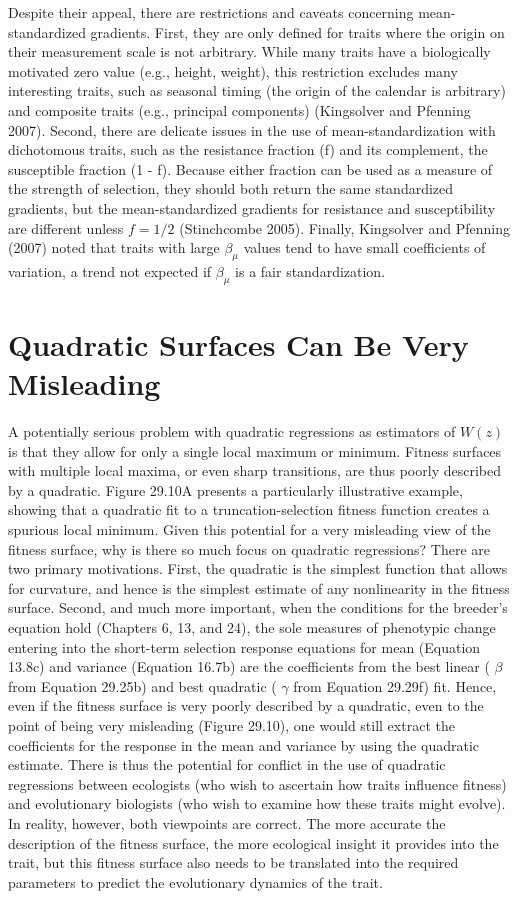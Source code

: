 \documentclass{article}
\begin{document}
Despite their appeal, there are restrictions and caveats concerning mean-standardized gradients. First, they are only defined for traits where the origin on their measurement scale is not arbitrary. While many traits have a biologically motivated zero value (e.g., height, weight), this restriction excludes many interesting traits, such as seasonal timing (the origin of the calendar is arbitrary) and composite traits (e.g., principal components) (Kingsolver and Pfenning 2007). Second, there are delicate issues in the use of mean-standardization with dichotomous traits, such as the resistance fraction (f) and its complement, the susceptible fraction (1 - f). Because either fraction can be used as a measure of the strength of selection, they should both return the same standardized gradients, but the mean-standardized gradients for resistance and susceptibility are different unless  $ f = 1/2 $ (Stinchcombe 2005). Finally, Kingsolver and Pfenning (2007) noted that traits with large  $ \beta_\mu $ values tend to have small coefficients of variation, a trend not expected if  $ \beta_\mu $ is a fair standardization.

\section{Quadratic Surfaces Can Be Very Misleading}
A potentially serious problem with quadratic regressions as estimators of  $ W(z) $ is that they allow for only a single local maximum or minimum. Fitness surfaces with multiple local maxima, or even sharp transitions, are thus poorly described by a quadratic. Figure 29.10A presents a particularly illustrative example, showing that a quadratic fit to a truncation-selection fitness function creates a spurious local minimum. Given this potential for a very misleading view of the fitness surface, why is there so much focus on quadratic regressions? There are two primary motivations. First, the quadratic is the simplest function that allows for curvature, and hence is the simplest estimate of any nonlinearity in the fitness surface. Second, and much more important, when the conditions for the breeder's equation hold (Chapters 6, 13, and 24), the sole measures of phenotypic change entering into the short-term selection response equations for mean (Equation 13.8c) and variance (Equation 16.7b) are the coefficients from the best linear ( $ \beta $ from Equation 29.25b) and best quadratic ( $ \gamma $ from Equation 29.29f) fit. Hence, even if the fitness surface is very poorly described by a quadratic, even to the point of being very misleading (Figure 29.10), one would still extract the coefficients for the response in the mean and variance by using the quadratic estimate. There is thus the potential for conflict in the use of quadratic regressions between ecologists (who wish to ascertain how traits influence fitness) and evolutionary biologists (who wish to examine how these traits might evolve). In reality, however, both viewpoints are correct. The more accurate the description of the fitness surface, the more ecological insight it provides into the trait, but this fitness surface also needs to be translated into the required parameters to predict the evolutionary dynamics of the trait.
\end{document}
